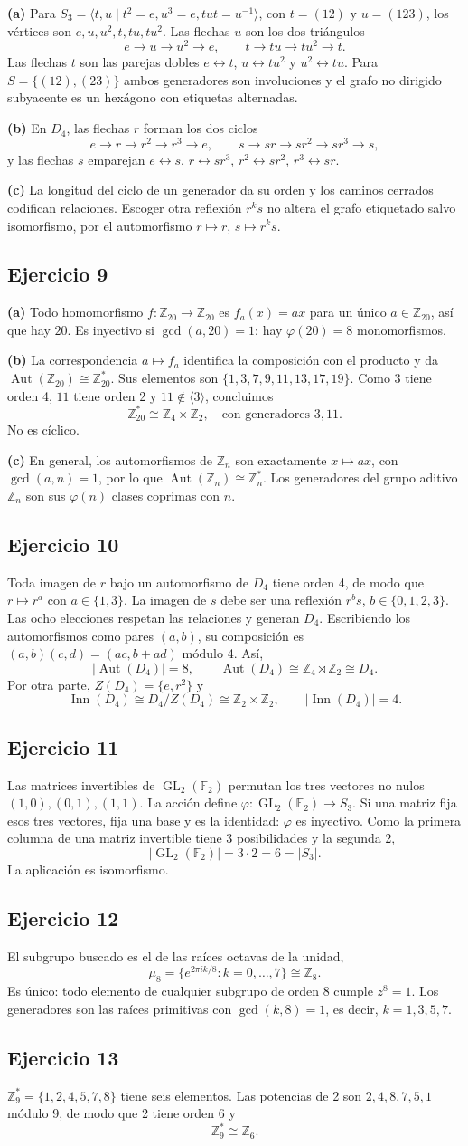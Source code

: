 \documentclass[11pt,a4paper]{article}
\newcommand{\Z}{\mathbb Z}
\newcommand{\F}{\mathbb F}
\newcommand{\ej}[1]{\subsection*{Ejercicio #1}}
\begin{document}
\textbf{(a)} Para $S_3=\langle t,u\mid t^2=e,u^3=e,tut=u^{-1}\rangle$, con $t=(12)$ y $u=(123)$, los vértices son $e,u,u^2,t,tu,tu^2$. Las flechas $u$ son los dos triángulos
\[e\to u\to u^2\to e,\qquad t\to tu\to tu^2\to t.\]
Las flechas $t$ son las parejas dobles $e\leftrightarrow t$, $u\leftrightarrow tu^2$ y $u^2\leftrightarrow tu$. Para $S=\{(12),(23)\}$ ambos generadores son involuciones y el grafo no dirigido subyacente es un hexágono con etiquetas alternadas.

\textbf{(b)} En $D_4$, las flechas $r$ forman los dos ciclos
\[e\to r\to r^2\to r^3\to e,\qquad s\to sr\to sr^2\to sr^3\to s,\]
y las flechas $s$ emparejan $e\leftrightarrow s$, $r\leftrightarrow sr^3$, $r^2\leftrightarrow sr^2$, $r^3\leftrightarrow sr$.

\textbf{(c)} La longitud del ciclo de un generador da su orden y los caminos cerrados codifican relaciones. Escoger otra reflexión $r^ks$ no altera el grafo etiquetado salvo isomorfismo, por el automorfismo $r\mapsto r$, $s\mapsto r^ks$.
\ej{9}
\textbf{(a)} Todo homomorfismo $f:\Z_{20}\to\Z_{20}$ es $f_a(x)=ax$ para un único $a\in\Z_{20}$, así que hay $20$. Es inyectivo si $\gcd(a,20)=1$: hay $\varphi(20)=8$ monomorfismos.

\textbf{(b)} La correspondencia $a\mapsto f_a$ identifica la composición con el producto y da $\operatorname{Aut}(\Z_{20})\cong\Z_{20}^*$. Sus elementos son $\{1,3,7,9,11,13,17,19\}$. Como $3$ tiene orden 4, $11$ tiene orden 2 y $11\notin\langle3\rangle$, concluimos
\[\Z_{20}^*\cong\Z_4\times\Z_2,\quad\text{con generadores }3,11.\]
No es cíclico.

\textbf{(c)} En general, los automorfismos de $\Z_n$ son exactamente $x\mapsto ax$, con $\gcd(a,n)=1$, por lo que $\operatorname{Aut}(\Z_n)\cong\Z_n^*$. Los generadores del grupo aditivo $\Z_n$ son sus $\varphi(n)$ clases coprimas con $n$.
\ej{10}
Toda imagen de $r$ bajo un automorfismo de $D_4$ tiene orden 4, de modo que $r\mapsto r^a$ con $a\in\{1,3\}$. La imagen de $s$ debe ser una reflexión $r^bs$, $b\in\{0,1,2,3\}$. Las ocho elecciones respetan las relaciones y generan $D_4$. Escribiendo los automorfismos como pares $(a,b)$, su composición es $(a,b)(c,d)=(ac,b+ad)$ módulo 4. Así,
\[|\operatorname{Aut}(D_4)|=8,\qquad\operatorname{Aut}(D_4)\cong\Z_4\rtimes\Z_2\cong D_4.\]
Por otra parte, $Z(D_4)=\{e,r^2\}$ y
\[\operatorname{Inn}(D_4)\cong D_4/Z(D_4)\cong\Z_2\times\Z_2,\qquad|\operatorname{Inn}(D_4)|=4.\]
\ej{11}
Las matrices invertibles de $\operatorname{GL}_2(\F_2)$ permutan los tres vectores no nulos $(1,0),(0,1),(1,1)$. La acción define $\varphi:\operatorname{GL}_2(\F_2)\to S_3$. Si una matriz fija esos tres vectores, fija una base y es la identidad: $\varphi$ es inyectivo. Como la primera columna de una matriz invertible tiene 3 posibilidades y la segunda 2,
\[|\operatorname{GL}_2(\F_2)|=3\cdot2=6=|S_3|.\]
La aplicación es isomorfismo.
\ej{12}
El subgrupo buscado es el de las raíces octavas de la unidad,
\[\mu_8=\{e^{2\pi ik/8}:k=0,\ldots,7\}\cong\Z_8.\]
Es único: todo elemento de cualquier subgrupo de orden 8 cumple $z^8=1$. Los generadores son las raíces primitivas con $\gcd(k,8)=1$, es decir, $k=1,3,5,7$.
\ej{13}
$\Z_9^*=\{1,2,4,5,7,8\}$ tiene seis elementos. Las potencias de 2 son $2,4,8,7,5,1$ módulo 9, de modo que 2 tiene orden 6 y
\[\Z_9^*\cong\Z_6.\]
\end{document}
